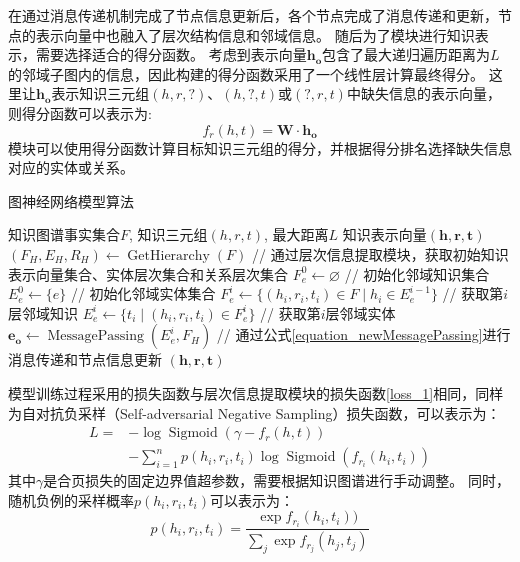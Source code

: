 \documentclass[algorithmlist, AutoFakeBold, AutoFakeSlant, figurelist, tablelist, nomlist, engineering]{seuthesix}
\begin{document}
在通过消息传递机制完成了节点信息更新后，各个节点完成了消息传递和更新，节点的表示向量中也融入了层次结构信息和邻域信息。
随后为了模块进行知识表示，需要选择适合的得分函数。
考虑到表示向量$\bm{h_o}$包含了最大递归遍历距离为$L$的邻域子图内的信息，因此构建的得分函数采用了一个线性层计算最终得分。
这里让$\bm{h_o}$表示知识三元组$(h, r, ?)$、$(h, ?, t)$或$(?, r, t)$中缺失信息的表示向量，则得分函数可以表示为:
\begin{equation}
  f_{r}(h, t) = \mathbf{W} \cdot \bm{h_o}
  \label{equation_GNNScore}
\end{equation}
模块可以使用得分函数计算目标知识三元组的得分，并根据得分排名选择缺失信息对应的实体或关系。

\begin{algorithm}[t]
	\caption{图神经网络模型算法}  
	\label{algorithm_GNN}
	\begin{algorithmic}[1]
  \Require 知识图谱事实集合$F$, 知识三元组$(h, r, t)$, 最大距离$L$
  \Ensure 知识表示向量$(\bm{h}, \bm{r}, \bm{t})$
  \State $(F_H, E_H, R_H) \leftarrow \operatorname{GetHierarchy}(F)$ // 通过层次信息提取模块，获取初始知识表示向量集合、实体层次集合和关系层次集合
  \State $F_{e}^{0} \leftarrow \varnothing$ // 初始化邻域知识集合
  \State $E_{e}^{0} \leftarrow \{e\}$ // 初始化邻域实体集合
  \State $F_{e}^{i} \leftarrow \{(h_i, r_i, t_i) \in F \mid h_i \in E_{e}^{i-1}\}$ // 获取第$i$层邻域知识
  \State $E_{e}^{i} \leftarrow \{t_i \mid (h_i, r_i, t_i) \in F_{e}^{i}\}$ // 获取第$i$层邻域实体
  \State $\bm{e_o} \leftarrow \operatorname{MessagePassing}(E_{e}^{i}, F_H)$ // 通过公式\ref{equation_newMessagePassing}进行消息传递和节点信息更新
  \EndFor
  \EndFor
  \State \Return $(\bm{h}, \bm{r}, \bm{t})$
	\end{algorithmic}
\end{algorithm} 

模型训练过程采用的损失函数与层次信息提取模块的损失函数\ref{loss_1}相同，同样为自对抗负采样（Self-adversarial Negative Sampling）损失函数，可以表示为：
\begin{equation}
  \begin{aligned}
  L= & -\log \operatorname{Sigmoid}\left(\gamma-f_r(h, t)\right) \\
  & -\sum_{i=1}^n p\left(h_i, r_i, t_i\right) \log \operatorname{Sigmoid}(f_{r_i}(h_i, t_i))
  \end{aligned}
\end{equation}
其中$\gamma$是合页损失的固定边界值超参数，需要根据知识图谱进行手动调整。
同时，随机负例的采样概率$p(h_i, r_i, t_i)$可以表示为：
\begin{equation}
  p(h_i, r_i, t_i)=\frac{\exp f_{r_i}(h_i, t_i))}{\sum_j \exp f_{r_j}(h_j, t_j)}
\end{equation}
\end{document}
